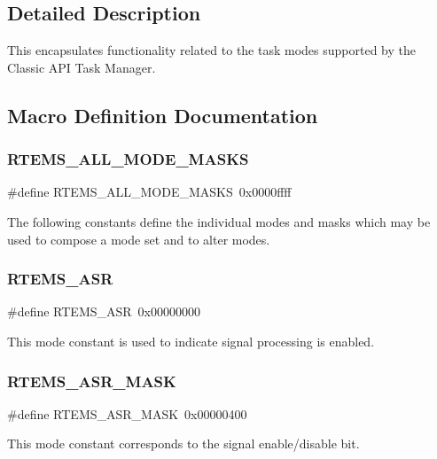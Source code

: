 \subsection{Detailed Description}
This encapsulates functionality related to the task modes supported by the Classic A\+PI Task Manager. 

\subsection{Macro Definition Documentation}
\mbox{\label{group__ClassicModes_gaf0e90e4128790ead489a17c87d7e3971}} 
\subsubsection{\texorpdfstring{RTEMS\_ALL\_MODE\_MASKS}{RTEMS\_ALL\_MODE\_MASKS}}
{\footnotesize\ttfamily \#define R\+T\+E\+M\+S\+\_\+\+A\+L\+L\+\_\+\+M\+O\+D\+E\+\_\+\+M\+A\+S\+KS~0x0000ffff}

The following constants define the individual modes and masks which may be used to compose a mode set and to alter modes. \mbox{\label{group__ClassicModes_ga70cd9a55b09454b95608db57279607cd}} 
\subsubsection{\texorpdfstring{RTEMS\_ASR}{RTEMS\_ASR}}
{\footnotesize\ttfamily \#define R\+T\+E\+M\+S\+\_\+\+A\+SR~0x00000000}

This mode constant is used to indicate signal processing is enabled. \mbox{\label{group__ClassicModes_ga6280155241d23527a803204145c313d6}} 
\subsubsection{\texorpdfstring{RTEMS\_ASR\_MASK}{RTEMS\_ASR\_MASK}}
{\footnotesize\ttfamily \#define R\+T\+E\+M\+S\+\_\+\+A\+S\+R\+\_\+\+M\+A\+SK~0x00000400}

This mode constant corresponds to the signal enable/disable bit. \mbox{\label{group__ClassicModes_gae40f8f4f4340c9a36e09e6d2be93ff5a}} 
